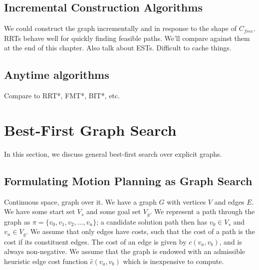 \documentclass{report}
\begin{document}
\subsection{Incremental Construction Algorithms}

We could construct the graph incrementally and in response to the shape
of $C_{free}$.
RRTs behave well for quickly finding feasible paths.
We'll compare against them at the end of this chapter.
Also talk about ESTs.
Difficult to cache things.

%

\subsection{Anytime algorithms}

Compare to RRT*, FMT*, BIT*, etc.

\section{Best-First Graph Search}
\label{sec:best-first}

In this section,
we discuss general best-first search over explicit graphs.

\subsection{Formulating Motion Planning as Graph Search}

Continuous space, graph over it.
We have a graph $G$ with vertices $V$ and edges $E$.
We have some start set $V_s$ and some goal set $V_g$.
We represent a path through the graph as
$\pi = \{ v_0, v_1, v_2, \dots, v_n \}$;
a candidate solution path then has $v_0 \in V_s$ and $v_n \in V_g$.
We assume that only edges have costs,
such that the cost of a path is the cost if its constituent edges.
The cost of an edge is given by $c(v_a,v_b)$, and is always non-negative.
We assume that the graph is endowed with an admissible heuristic edge cost
function
$\hat{c}(v_a,v_b)$
which is inexpensive to compute.
\end{document}
